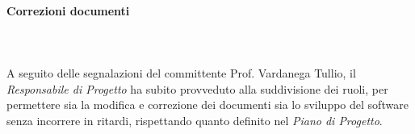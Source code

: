 \paragraph{Correzioni documenti}\mbox{} \\ \mbox{} \\
A seguito delle segnalazioni del committente Prof. Vardanega Tullio, il \textit{Responsabile di Progetto} ha subito provveduto alla suddivisione dei ruoli, per permettere sia la modifica e correzione dei documenti sia lo sviluppo del software senza incorrere in ritardi, rispettando quanto definito nel \textit{Piano di Progetto}.